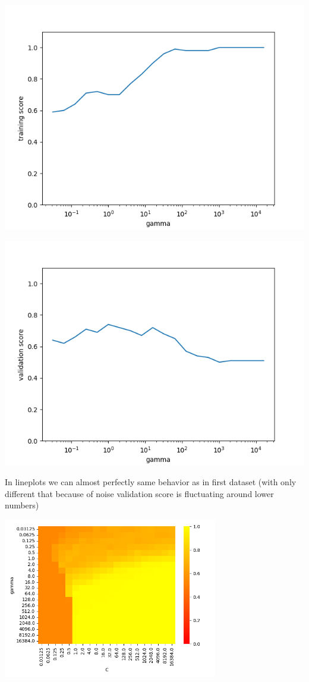 \documentclass[a4paper]{article}
\begin{document}
	\centerline{\includegraphics[width=1\textwidth]{dataset_2_train_gamma_scores}}  
	
	\centerline{\includegraphics[width=1\textwidth]{dataset_2_validation_gamma_scores}}  
	
	In lineplots we can almost perfectly same behavior as in first dataset (with only different that because of noise validation score is fluctuating around lower numbers)
	
	\centerline{\includegraphics[width=0.7\textwidth]{dataset_2_train_heatmap_scores}}  
	
\end{document}
